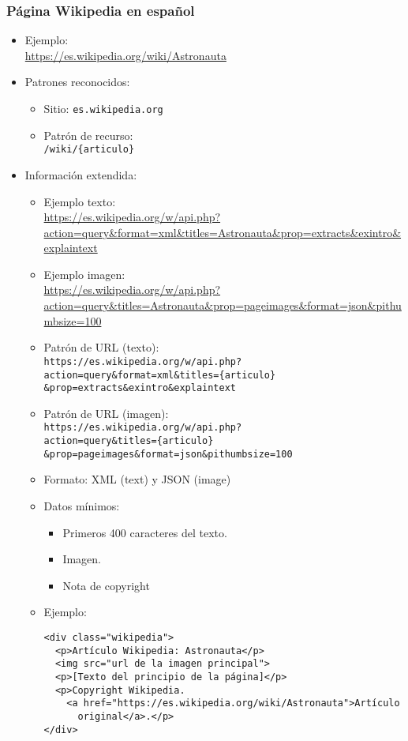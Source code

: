 \subsubsection{Página Wikipedia en español}

  \begin{itemize}
  \item Ejemplo: \\
    \url{https://es.wikipedia.org/wiki/Astronauta}
  \item Patrones reconocidos:
    \begin{itemize}
    \item Sitio: \texttt{es.wikipedia.org}
    \item Patrón de recurso: \\
      \texttt{/wiki/\{articulo\}}
    \end{itemize}
  \item Información extendida:
    \begin{itemize}
    \item Ejemplo texto: \\
      \url{https://es.wikipedia.org/w/api.php?action=query&format=xml&titles=Astronauta&prop=extracts&exintro&explaintext}
    \item Ejemplo imagen: \\
      \url{https://es.wikipedia.org/w/api.php?action=query&titles=Astronauta&prop=pageimages&format=json&pithumbsize=100}
    \item Patrón de URL (texto):\\
      \texttt{https://es.wikipedia.org/w/api.php?}\\
      \texttt{action=query\&format=xml\&titles=\{articulo\}}\\
      \texttt{\&prop=extracts\&exintro\&explaintext}
    \item Patrón de URL (imagen):\\
    \texttt{https://es.wikipedia.org/w/api.php?}\\
    \texttt{action=query\&titles=\{articulo\}}\\
    \texttt{\&prop=pageimages\&format=json\&pithumbsize=100}
    \item Formato: XML (text) y JSON (image)
    \item Datos mínimos:
      \begin{itemize}
      \item Primeros 400 caracteres del texto.
      \item Imagen.
      \item Nota de copyright
      \end{itemize}
    \item Ejemplo:

{\footnotesize
\begin{verbatim}
<div class="wikipedia">
  <p>Artículo Wikipedia: Astronauta</p>
  <img src="url de la imagen principal">
  <p>[Texto del principio de la página]</p>
  <p>Copyright Wikipedia.
    <a href="https://es.wikipedia.org/wiki/Astronauta">Artículo
      original</a>.</p>
</div>
\end{verbatim}
}
    \end{itemize}
  \end{itemize}


